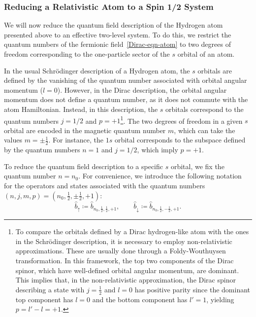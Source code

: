 \documentclass[letterpaper,12pt,titlepage,oneside,final]{book}
\begin{document}
\subsubsection*{Reducing a Relativistic Atom to a Spin 1/2 System }\label{sec:C2reduction}


We will now reduce the quantum field description of the Hydrogen atom presented above to an effective two-level system. To do this, we restrict the quantum numbers of the fermionic field~\eqref{Dirac-eqn-atom} to two degrees of freedom corresponding to the one-particle sector of the $s$ orbital of an atom. 

In the usual Schr\"odinger description of a Hydrogen atom, the $s$ orbitals are defined by the vanishing of the quantum number associated with orbital angular momentum ($l=0$). However, in the Dirac description, the orbital angular momentum does not define a quantum number, as it does not commute with the atom Hamiltonian. Instead, in this description, the $s$ orbitals correspond to the quantum numbers $j=  1/2$ and $p = +1$\footnote{To compare the orbitals defined by a Dirac hydrogen-like atom with the ones in the Schr\"odinger description, it is necessary to employ non-relativistic approximations. These are usually done through a Foldy-Wouthuysen~\cite{FoldyWou,RQMgreiner} transformation. In this framework, the top two components of the Dirac spinor, which have well-defined orbital angular momentum, are dominant. This implies that, in the non-relativistic approximation, the Dirac spinor describing a state with $j=\frac{1}{2}$ and $l=0$ has positive parity since the dominant top component has $l=0$ and the bottom component has $l'=1$, yielding $p = l'-l = +1$.}. The two degrees of freedom in a given $s$ orbital are encoded in the magnetic quantum number $m$, which can take the values $m = \pm\frac{1}{2}$. For instance, the $1s$ orbital corresponds to the subspace defined by the quantum numbers $n=1$ and $j=1/2$, which imply $p=+1$. 


To reduce the quantum field description to a specific $s$ orbital, we fix the quantum number $n = n_0$. For convenience, we introduce the following notation for the operators and states associated with the quantum numbers $(n,j,m,p) =(n_0,\frac{1}{2},\pm\tfrac{1}{2},+1)$:
\begin{equation}
    \hat{b}_\uparrow \coloneqq \hat{b}_{n_0,\frac{1}{2},\frac{1}{2},+1},\quad\quad
    \hat{b}_\downarrow \coloneqq \hat{b}_{n_0,\frac{1}{2},-\frac{1}{2},+1}.
\end{equation}
\vspace{-10mm}
\end{document}

